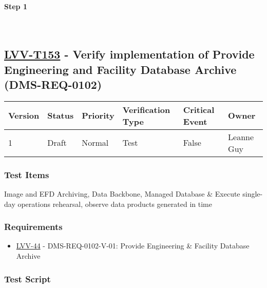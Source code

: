 \textbf{Step 1}\\
~\\
~\\

\hypertarget{lvv-t153---verify-implementation-of-provide-engineering-and-facility-database-archive-dms-req-0102}{%
\subsection{\texorpdfstring{\href{https://jira.lsstcorp.org/secure/Tests.jspa\#/testCase/LVV-T153}{LVV-T153}
- Verify implementation of Provide Engineering and Facility Database
Archive
(DMS-REQ-0102)}{LVV-T153 - Verify implementation of Provide Engineering and Facility Database Archive (DMS-REQ-0102)}}\label{lvv-t153---verify-implementation-of-provide-engineering-and-facility-database-archive-dms-req-0102}}

\begin{longtable}[]{@{}llllll@{}}
\toprule
Version & Status & Priority & Verification Type & Critical Event &
Owner\tabularnewline
\midrule
\endhead
1 & Draft & Normal & Test & False & Leanne Guy\tabularnewline
\bottomrule
\end{longtable}

\hypertarget{test-items-53}{%
\subsubsection{Test Items}\label{test-items-53}}

Image and EFD Archiving, Data Backbone, Managed Database \& Execute
single-day operations rehearsal, observe data products generated in time

\hypertarget{requirements-53}{%
\subsubsection{Requirements}\label{requirements-53}}

\begin{itemize}
\tightlist
\item
  \href{https://jira.lsstcorp.org/browse/LVV-44}{LVV-44} -
  DMS-REQ-0102-V-01: Provide Engineering \& Facility Database Archive
\end{itemize}

\hypertarget{test-script-53}{%
\subsubsection{Test Script}\label{test-script-53}}

